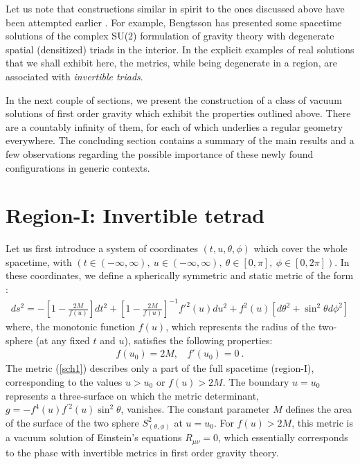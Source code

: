 \documentclass[preprint,aps,superscriptaddress,nofootinbib]{revtex4-1}
\begin{document}
Let us note that constructions similar in spirit to the ones discussed 
above have been attempted earlier \cite{bengtsson1,bengtsson,madhavan}. 
For example, Bengtsson \cite{bengtsson,bengtsson1} has presented some   
spacetime solutions of the complex SU(2) formulation 
\cite{sen,ashtekar} of gravity theory with degenerate spatial 
(densitized) triads in the interior. 
 In the explicit examples of real solutions that we 
shall exhibit here, the metrics, while being degenerate in a region, 
are associated with {\it invertible triads}.
 
In the next couple of sections, we present the construction of a class 
of vacuum solutions of first order gravity which exhibit the properties 
outlined above. There are a countably infinity of them, for each 
of which underlies a regular geometry everywhere. The concluding section 
contains  a summary of the main results and a few observations regarding 
the possible importance of these newly found configurations in generic 
contexts.

\section{Region-I: Invertible tetrad}
Let us first introduce a system of coordinates $(t,u,\theta,\phi)$ which 
cover the whole spacetime, with $\left(t\in (-\infty,\infty),~u\in 
(-\infty,\infty),~\theta\in[0,\pi],~\phi\in[0,2\pi]\right)$. In these 
coordinates, we define a spherically symmetric and static metric of the 
form \cite{bengtsson}:
 \begin{eqnarray}\label{sch1}
ds^2=-\left[1-\frac{2M}{f(u)}\right]dt^2 +
\left[1-\frac{2M}{f(u)}\right]^{-1} f'^{2}(u) du^2 + 
f^2(u)\left[d\theta^2+\sin^2 \theta d\phi^2\right]
\end{eqnarray}
where, the monotonic function $f(u)$, which represents the radius of the 
two-sphere (at any fixed $t$ and $u$), satisfies the following properties:
\begin{eqnarray}\label{f(u)}
f(u_0)=2M,~~~~f'(u_0)=0~.
\end{eqnarray}
The metric (\ref{sch1}) describes only a part  of the full 
spacetime (region-I), corresponding to the values $u>u_0$ or $f(u)>2M$. 
The boundary $u=u_0$ represents a three-surface on which the metric 
determinant, $g=-f^4 (u) f^{'2}(u)\sin^2\theta$, vanishes. The constant 
parameter $M$ defines the area of the surface of the two sphere 
$S^2_{(\theta,\phi)}$ at $u=u_0$. For $f(u)>2M$, this metric is a vacuum 
solution of Einstein's equations $R_{\mu\nu}=0$, which essentially 
corresponds to the phase with invertible metrics in first order gravity 
theory. 
\end{document}
